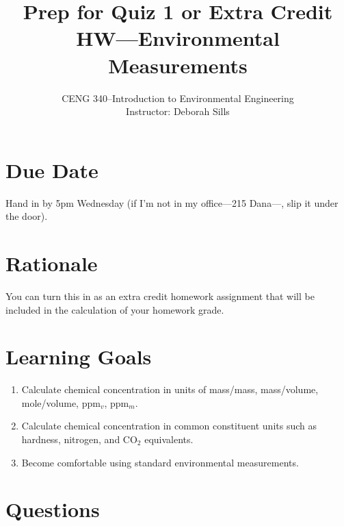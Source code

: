\documentclass[12pt,letterpaper]{article}
\begin{document}
\setlength{\parindent}{0cm} 


\frenchspacing

\title {Prep for Quiz 1 or Extra Credit HW---Environmental Measurements} 
\author {CENG 340--Introduction to Environmental Engineering\\
Instructor: Deborah Sills}
\maketitle

\section *{Due Date}
Hand in by 5pm Wednesday (if I'm not in my office---215 Dana---, slip it under the door).

\section *{Rationale}
You can turn this in as an extra credit homework assignment that will be included in the calculation of your homework grade.\\

\section *{Learning Goals}
\begin{enumerate}
\item Calculate chemical concentration in units of mass/mass, mass/volume, mole/volume, ppm$_v$, ppm$_m$.
\item Calculate chemical concentration in common constituent units such as hardness, nitrogen, and CO$_2$ equivalents. 
\item Become comfortable using standard environmental measurements.
\end{enumerate}

\section *{Questions}
\end{document}
